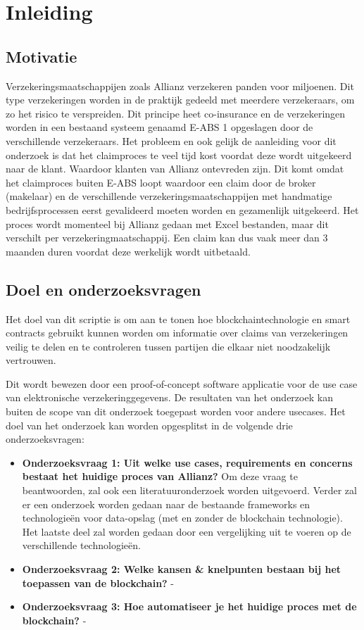 \chapter{Inleiding}
\section{Motivatie}
Verzekeringsmaatschappijen zoals Allianz verzekeren panden voor miljoenen. Dit type verzekeringen worden in de praktijk gedeeld met meerdere verzekeraars, om zo het risico te verspreiden. Dit principe heet co-insurance en de verzekeringen worden in een bestaand systeem genaamd E-ABS 1 opgeslagen door de verschillende verzekeraars.
Het probleem en ook gelijk de aanleiding voor dit onderzoek is dat het claimproces te veel tijd kost voordat deze wordt uitgekeerd naar de klant. Waardoor klanten van Allianz ontevreden zijn. Dit komt omdat het claimproces buiten E-ABS loopt waardoor een claim door de broker (makelaar) en de verschillende verzekeringsmaatschappijen met handmatige bedrijfsprocessen eerst gevalideerd moeten worden en gezamenlijk uitgekeerd. Het proces wordt momenteel bij Allianz gedaan met Excel bestanden, maar dit verschilt per verzekeringmaatschappij.
Een claim kan dus vaak meer dan 3 maanden duren voordat deze werkelijk wordt uitbetaald.

\section{Doel en onderzoeksvragen}
Het doel van dit scriptie is om aan te tonen hoe blockchaintechnologie en smart contracts gebruikt kunnen worden om informatie over claims van verzekeringen veilig te delen en te controleren tussen partijen die elkaar niet noodzakelijk vertrouwen.\par
Dit wordt bewezen door een proof-of-concept software applicatie voor de use case van elektronische verzekeringgegevens. De resultaten van het onderzoek kan buiten de scope van dit onderzoek toegepast worden voor andere usecases. Het doel van het onderzoek kan worden opgesplitst in de volgende drie onderzoeksvragen:
\begin{itemize}
  \item \textbf{Onderzoeksvraag 1: Uit welke use cases, requirements en concerns bestaat het huidige proces van Allianz?}
Om deze vraag te beantwoorden, zal ook een literatuuronderzoek worden uitgevoerd. Verder zal er een onderzoek worden gedaan naar de bestaande frameworks en technologieën voor data-opslag (met en zonder de blockchain technologie). Het laatste deel zal worden gedaan door een vergelijking uit te voeren op de verschillende technologieën.

  \item \textbf{Onderzoeksvraag 2: Welke kansen \& knelpunten bestaan bij het toepassen van de blockchain?} -
  \item \textbf{Onderzoeksvraag 3: Hoe automatiseer je het huidige proces met de blockchain?} -
\end{itemize}
\newpage

